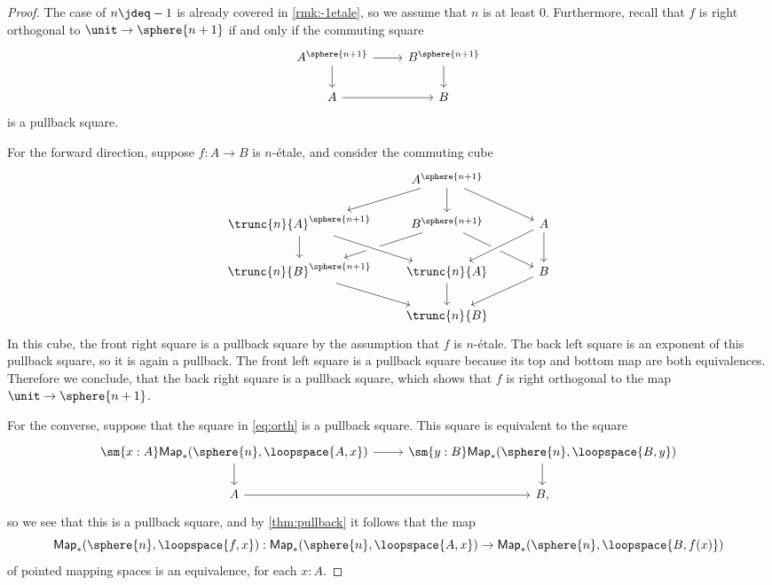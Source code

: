 \documentclass{msc}
\begin{document}
\begin{proof}
  The case of $n\jdeq -1$ is already covered in \cref{rmk:-1etale}, so we assume that $n$ is at least $0$. Furthermore, recall that $f$ is right orthogonal to $\unit\to\sphere{n+1}$ if and only if the commuting square
    \begin{equation}\label{eq:orth}
      \begin{tikzcd}
        A^{\sphere{n+1}} \arrow[r] \arrow[d] & B^{\sphere{n+1}} \arrow[d] \\
        A \arrow[r] & B
      \end{tikzcd}
    \end{equation}
    is a pullback square.

  For the forward direction, suppose $f:A\to B$ is $n$-\'etale, and consider the commuting cube
\begin{equation*}
\begin{tikzcd}
&[-1ex] A^{\sphere{n+1}} \arrow[dl] \arrow[d] \arrow[dr] &[2ex] \\
\trunc{n}{A}^{\sphere{n+1}} \arrow[d] & B^{\sphere{n+1}} \arrow[dl] \arrow[dr] & A \arrow[dl,crossing over] \arrow[d] \\
\trunc{n}{B}^{\sphere{n+1}} \arrow[dr] & \trunc{n}{A} \arrow[d] \arrow[from=ul,crossing over] & B \arrow[dl] \\
& \trunc{n}{B}
\end{tikzcd}
\end{equation*}
In this cube, the front right square is a pullback square by the assumption that $f$ is $n$-\'etale. The back left square is an exponent of this pullback square, so it is again a pullback. The front left square is a pullback square because its top and bottom map are both equivalences. Therefore we conclude, that the back right square is a pullback square, which shows that $f$ is right orthogonal to the map $\unit\to\sphere{n+1}$.

  For the converse, suppose that the square in \cref{eq:orth} is a pullback square. This square is equivalent to the square
  \begin{equation*}
    \begin{tikzcd}
      \sm{x:A}\mathsf{Map}_\ast(\sphere{n},\loopspace{A,x}) \arrow[r] \arrow[d] & \sm{y:B} \mathsf{Map}_\ast(\sphere{n},\loopspace{B,y}) \arrow[d] \\
      A \arrow[r] & B,
    \end{tikzcd}
  \end{equation*}
  so we see that this is a pullback square, and by \cref{thm:pullback} it follows that the map
  \begin{equation*}
    \mathsf{Map}_\ast(\sphere{n},\loopspace{f,x}):\mathsf{Map}_\ast(\sphere{n},\loopspace{A,x}) \to \mathsf{Map}_\ast(\sphere{n},\loopspace{B,f(x)})
  \end{equation*}
  of pointed mapping spaces is an equivalence, for each $x:A$.


\end{proof}
\end{document}
